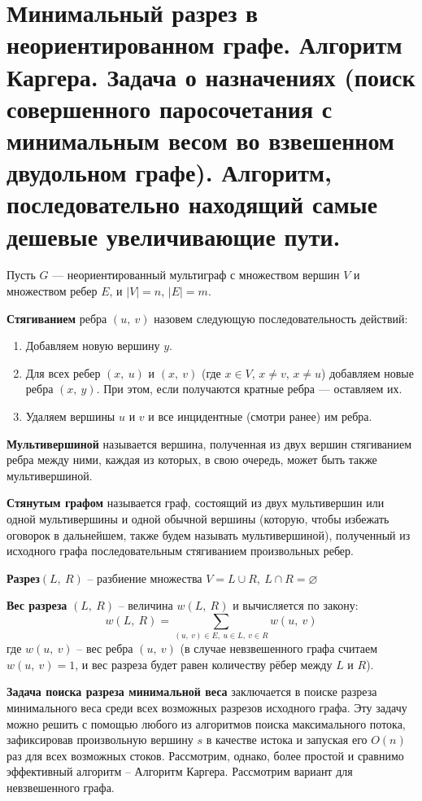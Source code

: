 \documentclass[a4paper,12pt]{article}
\begin{document}
\section{Минимальный разрез в неориентированном графе. Алгоритм Каргера. Задача о назначениях (поиск совершенного паросочетания с минимальным весом во взвешенном двудольном графе). Алгоритм, последовательно находящий самые дешевые увеличивающие пути.}
Пусть $G$ — неориентированный мультиграф с множеством вершин $V$ и множеством ребер $E$, и $|V| = n$, $|E| = m$.
\begin{definition}
    \textbf{Стягиванием} ребра $(u,\ v)$ назовем следующую последовательность действий:
    \begin{enumerate}
        \item Добавляем новую вершину $y$.
        \item Для всех ребер $(x,\ u)$ и $(x,\ v)$ (где $x \in V$, $x \neq v$, $x \neq u$) добавляем новые ребра $(x,\ y)$. При этом, если получаются кратные ребра — оставляем их.
        \item Удаляем вершины $u$ и $v$ и все инцидентные (смотри ранее) им ребра.
    \end{enumerate}
    
    \textbf{Мультивершиной} называется вершина, полученная из двух вершин стягиванием ребра между ними, каждая из которых, в свою очередь, может быть также мультивершиной.
    
    \textbf{Стянутым графом} называется граф, состоящий из двух мультивершин или одной мультивершины и одной обычной вершины (которую, чтобы избежать оговорок в дальнейшем, также будем называть мультивершиной), полученный из исходного графа последовательным стягиванием произвольных ребер.
\end{definition}
\begin{definition}
    \textbf{Разрез}$(L,\ R)$ -- разбиение множества $V = L \cup R,\ L \cap R = \varnothing$
    
    \textbf{Вес разреза} $(L,\ R)$ -- величина $w(L,\ R)$ и вычисляется по закону:\[w(L,\ R) = \sum\limits_{(u,\ v) \in E,\ u \in L,\ v \in R} w(u,\ v)\] где $w(u,\ v)$ -- вес ребра $(u,\ v)$ (в случае невзвешенного графа считаем $w(u,\ v) = 1$, и вес разреза будет равен количеству рёбер между $L$ и $R$).
\end{definition}

\textbf{Задача поиска разреза минимальной веса}  заключается в поиске разреза минимального веса среди всех возможных разрезов исходного графа. Эту задачу можно решить с помощью любого из алгоритмов поиска максимального потока, зафиксировав произвольную вершину $s$ в качестве истока и запуская его $O(n)$ раз для всех возможных стоков. Рассмотрим, однако, более простой и сравнимо эффективный алгоритм -- Алгоритм Каргера. Рассмотрим вариант для невзвешенного графа.
\end{document}
